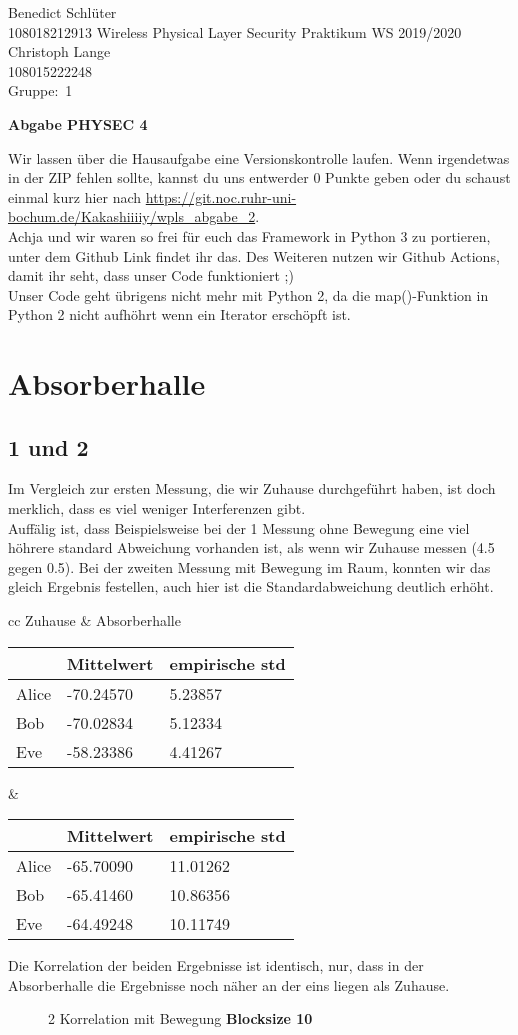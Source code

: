 \documentclass[12pt,a4paper]{article}
\newcommand{\student}{Benedict Schlüter\\ 108018212913 } %
\newcommand{\partner}{Christoph Lange\\ 108015222248} %
\newcommand{\group}{1} %
\newcommand{\hwheadtwo}{$ $
  \vspace{-2cm}
  
\noindent \student \qquad \qquad  Wireless Physical Layer Security Praktikum \hfill WS 2019/2020 \\
\noindent \partner \\
\noindent Gruppe:~\group\\
$ $

  
\begin{center}    
{\Large \bf Abgabe PHYSEC 4}
\end{center}
}
\begin{document}
\hwheadtwo
Wir lassen über die Hausaufgabe eine Versionskontrolle laufen. Wenn irgendetwas in der ZIP fehlen sollte, kannst du uns entwerder 0 Punkte geben oder du schaust einmal kurz hier nach \url{https://git.noc.ruhr-uni-bochum.de/Kakashiiiiy/wpls_abgabe_2}.\\
Achja und wir waren so frei für euch das Framework in Python 3 zu portieren, unter dem Github Link findet ihr das. Des Weiteren nutzen wir Github Actions, damit ihr seht, dass unser Code funktioniert ;)\\
Unser Code geht übrigens nicht mehr mit Python 2, da die map()-Funktion in Python 2 nicht aufhöhrt wenn ein Iterator erschöpft ist.
\section{Absorberhalle}
\subsection*{1 und 2 }
Im Vergleich zur ersten Messung, die wir Zuhause durchgeführt haben, ist doch merklich, dass es viel weniger Interferenzen gibt.\\ 
Auffälig ist, dass Beispielsweise bei der 1 Messung ohne Bewegung eine viel höhrere standard Abweichung vorhanden ist, als wenn wir Zuhause messen (4.5 gegen 0.5). Bei der zweiten Messung mit Bewegung im Raum, konnten wir das gleich Ergebnis festellen, auch hier ist die Standardabweichung deutlich erhöht.
\begin{table}[H]
\centering
\begin{tabular}{ cc }
Zuhause & Absorberhalle  \\
\begin{tabular}{l|l|l}
& Mittelwert & empirische std \\
\hline
Alice & -70.24570 & 5.23857 \\
\hline
Bob & -70.02834 & 5.12334 \\
\hline
Eve & -58.23386 & 4.41267 \\
\end{tabular} &
\begin{tabular}{l|l|l}
& Mittelwert & empirische std \\
\hline
Alice & -65.70090 & 11.01262 \\
\hline
Bob & -65.41460 & 10.86356 \\
\hline
Eve & -64.49248 & 10.11749 \\
\end{tabular}
\end{tabular}
\end{table}
Die Korrelation der beiden Ergebnisse ist identisch, nur, dass in der Absorberhalle die Ergebnisse noch näher an der eins liegen als Zuhause.
\begin{figure}[H]
\centering
{}   \qquad
{}
\caption{2 Korrelation mit Bewegung  \textbf{Blocksize 10}}
\label{fig:2}
\end{figure}
\end{document}

